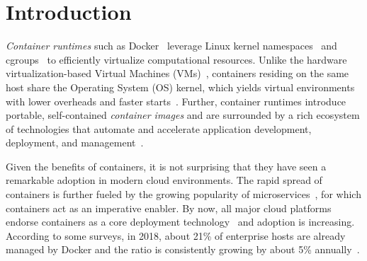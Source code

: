 \section{Introduction}
\label{sec:intro}

%
%
%
%
%
%
%


\emph{Container runtimes} such as Docker~\cite{docker} 
leverage Linux kernel namespaces~\cite{namespaces} and cgroups~\cite{cgroups}
to efficiently virtualize computational resources.
%
Unlike the hardware virtualization-based Virtual Machines
(VMs)~\cite{adams2006comparison}, containers residing on the same host share
the Operating System (OS) kernel, which yields virtual environments with
lower overheads and faster starts~\cite{7819678}.
%
Further, container runtimes introduce portable, self-contained \emph{container
images} and are surrounded by a rich ecosystem of technologies that automate
and accelerate application development, deployment, and
management~\cite{cncfprojects}.

Given the benefits of containers, it is not surprising that they have seen a
remarkable adoption in modern cloud environments.
%
The rapid spread of containers is further fueled by the growing popularity of
microservices~\cite{wolff2016microservices},
for which containers act as an imperative enabler.
%
By now, all major cloud platforms endorse containers as a core deployment
technology~\cite{googlecengine,azurec,ibmkube,awscont} and adoption
is increasing.
%
According to some surveys, in 2018, about 21\% of enterprise hosts are already
managed by Docker and the ratio is consistently growing by about 5\%
annually~\cite{20percentdocker}.


